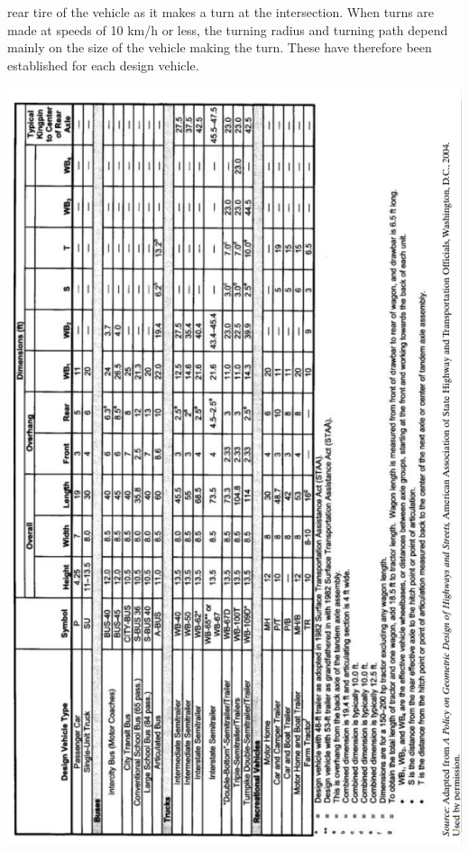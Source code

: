 rear tire of the vehicle as it makes a turn at the intersection. When turns are
made at speeds of 10 km/h or less, the turning radius and turning path depend
mainly on the size of the vehicle making the turn. These have therefore been
established for each design vehicle.
\newpage
\begin{center}
	\includegraphics[scale=0.8]{gfx/staticDesignTable.png}
\end{center} 
\newpage
